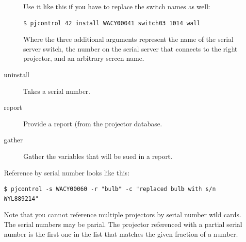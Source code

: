 \documentclass[11pt]{article}
\begin{document}
\begin{description}
  Use it like this if you have to replace the switch names as well:

\begin{verbatim}
$ pjcontrol 42 install WACY00041 switch03 1014 wall
\end{verbatim}
  
 Where the three additional arguments represent the name of the serial
 server switch, the number on the serial server that connects to the
 right projector, and an arbitrary screen name.


\item[uninstall] Takes a serial number.

\item[report] Provide a report (from the projector database.

\item[gather] Gather the variables that will be sued in a report.


\end{description}

Reference by serial number looks like this:

\begin{verbatim}
$ pjcontrol -s WACY00060 -r "bulb" -c "replaced bulb with s/n WYL889214"
\end{verbatim}

Note that you cannot reference multiple projectors by serial number
wild cards.  The serial numbers may be parial.  The projector
referenced with a partial serial number is the first one in the list
that matches the given fraction of a number.
\end{document}
